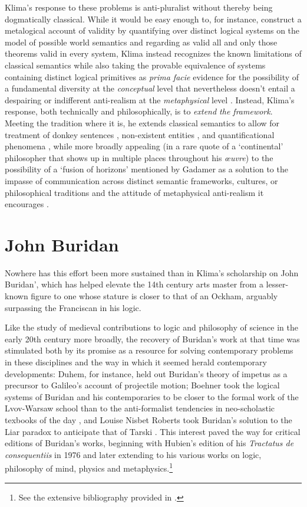 \documentclass[]{article}
\begin{document}
Klima's response to these problems is anti-pluralist 
without thereby being dogmatically classical. 
While it would be easy enough to, for instance, 
construct a metalogical account of validity by quantifying over distinct logical systems on the model of possible world semantics and regarding as valid all and only those theorems valid in every system, 
Klima instead recognizes the known limitations of classical semantics 
while also taking the provable equivalence of systems containing distinct logical primitives
as \emph{prima facie} evidence for the possibility of a fundamental diversity at the \emph{conceptual} level 
that nevertheless doesn't entail a despairing or indifferent anti-realism at the \emph{metaphysical} level \autocite{Klima2012}.
Instead, 
Klima's response, 
both technically and philosophically, 
is to \emph{extend the framework}. 
Meeting the tradition where it is, he extends classical semantics to allow for treatment of 
donkey sentences \autocite{Klima1988,Klima2010}, 
non-existent entities \autocite{Klima2001}, 
and quantificational phenomena \autocite{KlimaSandu1990},
while more broadly appealing (in a rare quote of a `continental' philosopher that shows up in multiple places throughout his \emph{\oe{}uvre}) 
to the possibility of a `fusion of horizons' mentioned by Gadamer 
as a solution to the impasse of communication across distinct semantic frameworks, cultures, or philosophical traditions 
and the attitude of metaphysical anti-realism it encourages \autocite{Klima2000,Klima2009a}.

\section{John Buridan}
Nowhere has this effort been more sustained than in Klima's scholarship on John Buridan', 
which has helped elevate the 14th century arts master from a lesser-known figure 
to one whose stature is closer to that of an Ockham, 
arguably surpassing the Franciscan in his logic.

Like the study of medieval contributions to logic and philosophy of science in the early 20th century more broadly, 
the recovery of Buridan's work at that time was stimulated 
both by
its promise as a resource for solving contemporary problems in these disciplines 
and the way in which it seemed herald contemporary developments:  
Duhem, for instance, held out Buridan's theory of impetus as a precursor to Galileo's account of projectile motion; 
Boehner took the logical systems of Buridan and his contemporaries to be closer to the formal work of the Lvov-Warsaw school 
than to the anti-formalist tendencies in neo-scholastic texbooks of the day \autocite{Boehner1952}, 
and Louise Nisbet Roberts took Buridan's solution to the Liar paradox to anticipate that of Tarski \autocite[100]{Roberts1953}. 
This interest paved the way for critical editions of Buridan's works, beginning with Hubien's edition of his \emph{Tractatus de consequentiis} in 1976 and later extending to his various works on logic, philosophy of mind, physics and metaphysics.\footnote{See the extensive bibliography provided in \autocite{sep-buridan}.}
\end{document}
